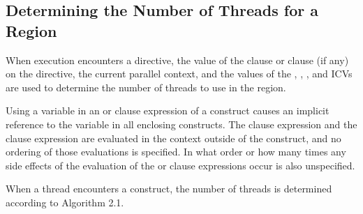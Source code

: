 \subsection{Determining the Number of Threads for a  Region}
\label{subsec:Determining the Number of Threads for a parallel Region}
When execution encounters a  directive, the value of the  
clause or  clause (if any) on the directive, the current parallel 
context, and the values of the , , 
, and 
ICVs are used to determine the number of threads to use in the region.

Using a variable in an  or  clause expression of a
 construct causes an implicit reference to the variable in all 
enclosing constructs. The  clause expression and the  
clause expression are evaluated in the context outside of the  
construct, and no ordering of those evaluations is specified. In what order or 
how many times any side effects of the evaluation of the  or 
 clause expressions occur is also unspecified.

When a thread encounters a  construct, the number of threads is 
determined according to Algorithm 2.1.


